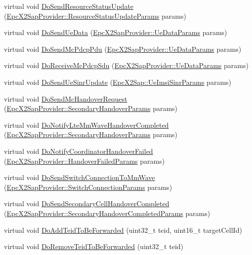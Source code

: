 \begin{DoxyCompactItemize}
\item 
virtual void \hyperlink{classns3_1_1EpcX2_a556c1c456108f8e1dff65289073d9b55}{Do\+Send\+Resource\+Status\+Update} (\hyperlink{structns3_1_1EpcX2Sap_1_1ResourceStatusUpdateParams}{Epc\+X2\+Sap\+Provider\+::\+Resource\+Status\+Update\+Params} params)
\item 
virtual void \hyperlink{classns3_1_1EpcX2_a8a20256ed59b6f7f03095c3386ecc6d1}{Do\+Send\+Ue\+Data} (\hyperlink{structns3_1_1EpcX2Sap_1_1UeDataParams}{Epc\+X2\+Sap\+Provider\+::\+Ue\+Data\+Params} params)
\item 
virtual void \hyperlink{classns3_1_1EpcX2_a641588d125f600122d56e34fa1fddd5c}{Do\+Send\+Mc\+Pdcp\+Pdu} (\hyperlink{structns3_1_1EpcX2Sap_1_1UeDataParams}{Epc\+X2\+Sap\+Provider\+::\+Ue\+Data\+Params} params)
\item 
virtual void \hyperlink{classns3_1_1EpcX2_a48c9322fd4cfc56fbcfb78c98ee1b7f6}{Do\+Receive\+Mc\+Pdcp\+Sdu} (\hyperlink{structns3_1_1EpcX2Sap_1_1UeDataParams}{Epc\+X2\+Sap\+Provider\+::\+Ue\+Data\+Params} params)
\item 
virtual void \hyperlink{classns3_1_1EpcX2_a54d091a779cfe55461d28fa9e81fd6ca}{Do\+Send\+Ue\+Sinr\+Update} (\hyperlink{structns3_1_1EpcX2Sap_1_1UeImsiSinrParams}{Epc\+X2\+Sap\+::\+Ue\+Imsi\+Sinr\+Params} params)
\item 
virtual void \hyperlink{classns3_1_1EpcX2_a7f811829874466c79c17a804dead4e90}{Do\+Send\+Mc\+Handover\+Request} (\hyperlink{structns3_1_1EpcX2Sap_1_1SecondaryHandoverParams}{Epc\+X2\+Sap\+Provider\+::\+Secondary\+Handover\+Params} params)
\item 
virtual void \hyperlink{classns3_1_1EpcX2_aa2ab1580f97cbebf950702b289032f9f}{Do\+Notify\+Lte\+Mm\+Wave\+Handover\+Completed} (\hyperlink{structns3_1_1EpcX2Sap_1_1SecondaryHandoverParams}{Epc\+X2\+Sap\+Provider\+::\+Secondary\+Handover\+Params} params)
\item 
virtual void \hyperlink{classns3_1_1EpcX2_a89925408a45ab7cfaf98db08ad859e94}{Do\+Notify\+Coordinator\+Handover\+Failed} (\hyperlink{structns3_1_1EpcX2Sap_1_1HandoverFailedParams}{Epc\+X2\+Sap\+Provider\+::\+Handover\+Failed\+Params} params)
\item 
virtual void \hyperlink{classns3_1_1EpcX2_abf288cbe6a364c4e9da3329f96dacfc5}{Do\+Send\+Switch\+Connection\+To\+Mm\+Wave} (\hyperlink{structns3_1_1EpcX2Sap_1_1SwitchConnectionParams}{Epc\+X2\+Sap\+Provider\+::\+Switch\+Connection\+Params} params)
\item 
virtual void \hyperlink{classns3_1_1EpcX2_a2ab46d3ece4e6af595249144a843ffbf}{Do\+Send\+Secondary\+Cell\+Handover\+Completed} (\hyperlink{structns3_1_1EpcX2Sap_1_1SecondaryHandoverCompletedParams}{Epc\+X2\+Sap\+Provider\+::\+Secondary\+Handover\+Completed\+Params} params)
\item 
virtual void \hyperlink{classns3_1_1EpcX2_a3011b0d30c590a60723b205ae0e9fd85}{Do\+Add\+Teid\+To\+Be\+Forwarded} (uint32\+\_\+t teid, uint16\+\_\+t target\+Cell\+Id)
\item 
virtual void \hyperlink{classns3_1_1EpcX2_aec62d502e62740d99b98ef7e64a90b50}{Do\+Remove\+Teid\+To\+Be\+Forwarded} (uint32\+\_\+t teid)
\end{DoxyCompactItemize}
